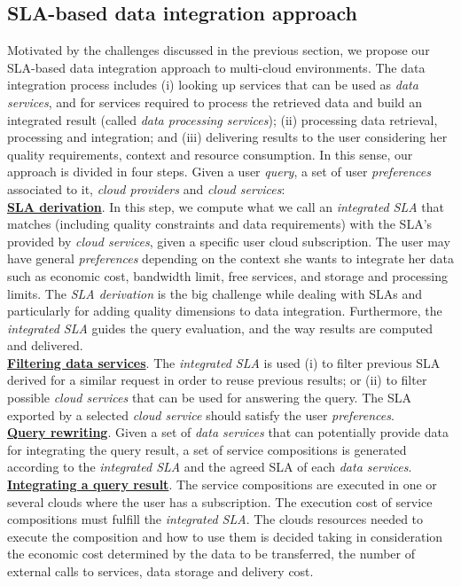 \subsection{SLA-based data integration approach}
Motivated by the challenges discussed in the previous section, we propose our SLA-based data integration approach to multi-cloud environments. The data integration process includes (i) looking up services that can be used as \textit{data services}, and for services required to process the retrieved data and build an integrated result (called \textit{data processing services}); (ii) processing data retrieval, processing and integration; and (iii) delivering results to the user considering her quality requirements, context and resource consumption.  In this sense, our approach is divided in four steps. Given a user \textit{query}, a set of user \textit{preferences} associated to it, \textit{cloud providers} and \textit{cloud services}:
\\
\textbf{\underline{SLA derivation}}. In this step, we compute what we call an \textsl{integrated
SLA} that matches (including quality constraints and data requirements) with the SLA's provided by \textit{cloud services}, given a specific user cloud subscription. The user may have general \textit{preferences} depending on the context she wants to integrate her data such as economic cost, bandwidth limit, free services, and storage and processing limits. The \textit{SLA derivation} is the big challenge while dealing with SLAs and particularly for adding quality dimensions to data integration. Furthermore, the \textsl{integrated SLA} guides the query evaluation, and the way results are computed and delivered. \\
\textbf{\underline{Filtering data services}}. The \textsl{integrated SLA} is used (i)
to filter previous SLA derived for a similar request in order to reuse previous results; or (ii) to filter possible \textit{cloud services} that can be used for answering the query. The SLA exported by a selected \textit{cloud service} should satisfy the user \textit{preferences}. \\
\textbf{\underline{Query rewriting}}. Given a set of \textit{data services} that can
potentially provide data for integrating the query result, a set of service compositions is generated according to the \textsl{integrated SLA} and the agreed SLA of each \textit{data services}. \\
\textbf{\underline{Integrating a query result}}. The service compositions are executed
in one or several clouds where the user has a subscription. The execution cost of service compositions must fulfill the \textsl{integrated SLA}. The clouds resources needed to execute the composition and how to use them is decided taking in consideration the economic cost determined by the data to be transferred, the number of external calls to services, data storage and delivery cost.


